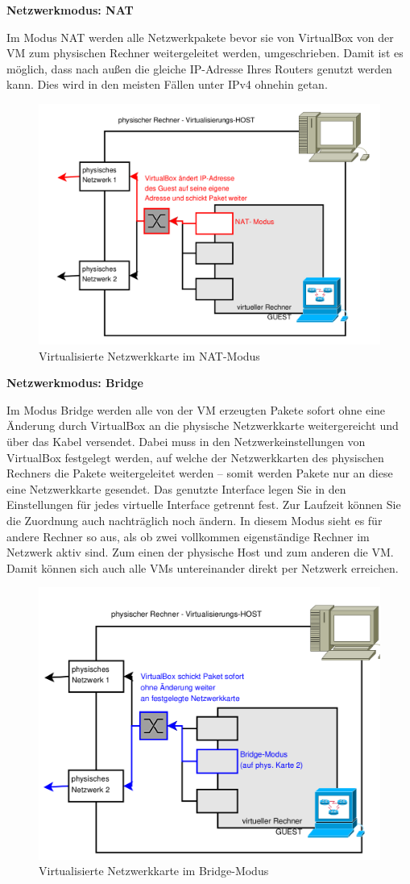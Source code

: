 \documentclass[paper=a4,fontsize=11pt]{scrartcl}%
\numberwithin{equation}{section}
\begin{document}
\begin{center}
\Large{\textbf{Netzwerkmodus: NAT}}
\end{center}
Im Modus NAT werden alle Netzwerkpakete bevor sie von VirtualBox von der VM zum physischen Rechner weitergeleitet werden, umgeschrieben. Damit ist es möglich, dass nach außen die gleiche IP-Adresse Ihres Routers genutzt werden kann. Dies wird in den meisten Fällen unter IPv4 ohnehin getan.
\begin{figure}[H]
\centering
\includegraphics[scale=0.35]{vbox5}
\caption{Virtualisierte Netzwerkkarte im NAT-Modus}
\end{figure}
\begin{center}
\Large{\textbf{Netzwerkmodus: Bridge}}
\end{center}
Im Modus Bridge werden alle von der VM erzeugten Pakete sofort ohne eine Änderung durch VirtualBox an die physische Netzwerkkarte weitergereicht und über das Kabel versendet. Dabei muss in den Netzwerkeinstellungen von VirtualBox festgelegt werden, auf welche der Netzwerkkarten des physischen Rechners die Pakete weitergeleitet werden -- somit werden Pakete nur an diese eine Netzwerkkarte gesendet. Das genutzte Interface legen Sie in den Einstellungen für jedes virtuelle Interface getrennt fest. Zur Laufzeit können Sie die Zuordnung auch nachträglich noch ändern. In diesem Modus sieht es für andere Rechner so aus, als ob zwei vollkommen eigenständige Rechner im Netzwerk aktiv sind. Zum einen der physische Host und zum anderen die VM. Damit können sich auch alle VMs untereinander direkt per Netzwerk erreichen.
\begin{figure}[H]
\centering
\includegraphics[scale=0.35]{vbox6}
\caption{Virtualisierte Netzwerkkarte im Bridge-Modus}
\end{figure}
\end{document}
